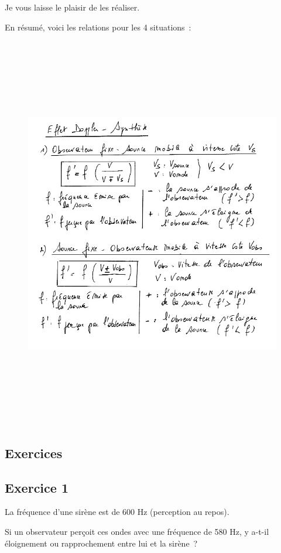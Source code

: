 Je vous laisse le plaisir de les réaliser.

En résumé, voici les relations pour les 4 situations~:
\begin{figure}
\centering
\includegraphics[width=17.866cm,height=17.32cm]{Pictures/100000010000025C00000234BE3EA55298C88B1D.png}
\caption{}
\end{figure}

\subsection{Exercices}

\subsection{Exercice 1}%

La fréquence d'une sirène est de 600 Hz (perception au repos).

Si un observateur perçoit ces ondes avec une fréquence de 580 Hz, y
a-t-il éloignement ou rapprochement entre lui et la sirène~?

